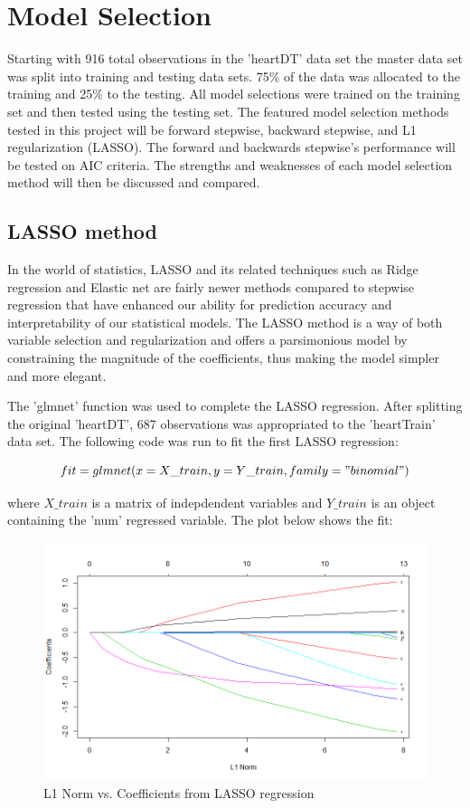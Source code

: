 \documentclass[12pt]{article}
\begin{document}
\section{Model Selection}
Starting with 916 total observations in the 'heartDT' data set the master data set was split into training and testing data sets. 75\% of the data was allocated to the training and 25\% to the testing. All model selections were trained on the training set and then tested using the testing set. The featured model selection methods tested in this project will be forward stepwise, backward stepwise, and L1 regularization (LASSO). The forward and backwards stepwise's performance will be tested on AIC criteria. The strengths and weaknesses of each model selection method will then be discussed and compared. 

\subsection{LASSO method}
In the world of statistics, LASSO and its related techniques such as Ridge regression and Elastic net are fairly newer methods compared to stepwise regression that have enhanced our ability for prediction accuracy and interpretability of our statistical models. The LASSO method is a way of both variable selection and regularization and offers a parsimonious model by constraining the magnitude of the coefficients, thus making the model simpler and more elegant. 

The 'glmnet' function was used to complete the LASSO regression. After splitting the original 'heartDT', 687 observations was appropriated to the 'heartTrain' data set. The following code was run to fit the first LASSO regression: 

\[fit = glmnet(x=X\_train, y=Y\_train, family = "binomial")\]

where $X\_train$ is a matrix of indepdendent variables and $Y\_train$ is an object containing the 'num' regressed variable. The plot below shows the fit: 

\begin{figure}[h!]
\begin{center}
\includegraphics[scale=.5]{fit_l1norm}
\caption{L1 Norm vs. Coefficients from LASSO regression}
\end{center}
\end{figure}
\end{document}
